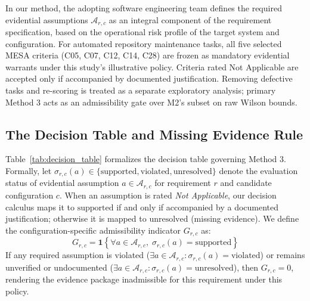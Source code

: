\documentclass[runningheads]{llncs}
\begin{document}
In our method, the adopting software engineering team defines the required evidential assumptions $\mathcal{A}_{r,c}$ as an integral component of the requirement specification, based on the operational risk profile of the target system and configuration. For automated repository maintenance tasks, all five selected MESA criteria (C05, C07, C12, C14, C28) are frozen as mandatory evidential warrants under this study's illustrative policy. Criteria rated Not Applicable are accepted only if accompanied by documented justification. Removing defective tasks and re-scoring is treated as a separate exploratory analysis; primary Method 3 acts as an admissibility gate over M2's subset on raw Wilson bounds.

\subsection{The Decision Table and Missing Evidence Rule}
Table~\ref{tab:decision_table} formalizes the decision table governing Method 3. Formally, let $\sigma_{r,c}(a) \in \{ \text{supported}, \text{violated}, \text{unresolved} \}$ denote the evaluation status of evidential assumption $a \in \mathcal{A}_{r,c}$ for requirement $r$ and candidate configuration $c$. When an assumption is rated \emph{Not Applicable}, our decision calculus maps it to $\text{supported}$ if and only if accompanied by a documented justification; otherwise it is mapped to $\text{unresolved}$ (missing evidence). We define the configuration-specific admissibility indicator $G_{r,c}$ as:
\begin{equation}
\label{eq:gate}
G_{r,c} = \mathbf{1} \left\{ \forall a \in \mathcal{A}_{r,c}, \; \sigma_{r,c}(a) = \text{supported} \right\}
\end{equation}
If any required assumption is violated ($\exists a \in \mathcal{A}_{r,c}: \sigma_{r,c}(a) = \text{violated}$) or remains unverified or undocumented ($\exists a \in \mathcal{A}_{r,c}: \sigma_{r,c}(a) = \text{unresolved}$), then $G_{r,c} = 0$, rendering the evidence package inadmissible for this requirement under this policy. 
\end{document}
